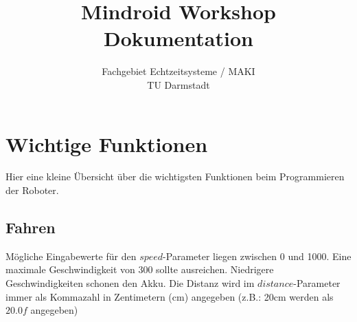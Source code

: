 \documentclass[
	12pt,
	colorbacktitle,
	accentcolor=tud1c,
	german,
	article
]{tuddesign/tudreport}
\begin{document}
	
	\author{}
	\title{Mindroid Workshop \\ Dokumentation}
	\subtitle{Fachgebiet Echtzeitsysteme / MAKI \\ TU Darmstadt}
	
	\maketitle	

	\section{Wichtige Funktionen}
	Hier eine kleine Übersicht über die wichtigsten Funktionen beim Programmieren der Roboter.
	
	\subsection{Fahren}
		Mögliche Eingabewerte für den $speed$-Parameter liegen zwischen 0 und 1000.
		Eine maximale Geschwindigkeit von $300$ sollte ausreichen. Niedrigere Geschwindigkeiten schonen den Akku.	
		Die Distanz wird im $distance$-Parameter immer als Kommazahl in Zentimetern (cm) angegeben (z.B.: 20cm werden als $20.0f$ angegeben)
	
\end{document}
